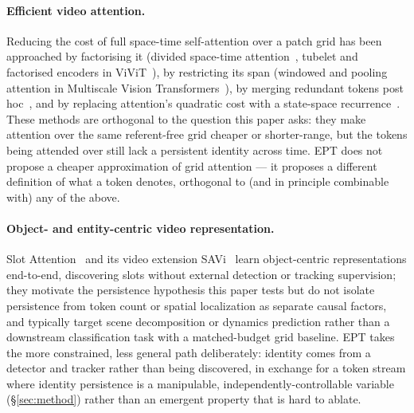 \label{sec:related-work}

\paragraph{Efficient video attention.}
Reducing the cost of full space-time self-attention over a patch grid has
been approached by factorising it (divided space-time
attention~\cite{bertasius2021timesformer}, tubelet and factorised encoders
in ViViT~\cite{arnab2021vivit}), by restricting its span (windowed and
pooling attention in Multiscale Vision
Transformers~\cite{fan2021multiscale}), by merging redundant tokens
post hoc~\cite{bolya2023tome}, and by replacing attention's quadratic cost
with a state-space recurrence~\cite{gu2023mamba}. These methods are
orthogonal to the question this paper asks: they make attention over the
same referent-free grid cheaper or shorter-range, but the tokens being
attended over still lack a persistent identity across time. EPT does not
propose a cheaper approximation of grid attention --- it proposes a
different definition of what a token denotes, orthogonal to (and in
principle combinable with) any of the above.

\paragraph{Object- and entity-centric video representation.}
Slot Attention~\cite{locatello2020slot} and its video extension
SAVi~\cite{kipf2022savi} learn object-centric representations end-to-end,
discovering slots without external detection or tracking supervision; they
motivate the persistence hypothesis this paper tests but do not isolate
persistence from token count or spatial localization as separate causal
factors, and typically target scene decomposition or dynamics prediction
rather than a downstream classification task with a matched-budget grid
baseline. EPT takes the more constrained, less general path deliberately:
identity comes from a detector and tracker rather than being discovered, in
exchange for a token stream where identity persistence is a manipulable,
independently-controllable variable (\S\ref{sec:method}) rather than an
emergent property that is hard to ablate.

